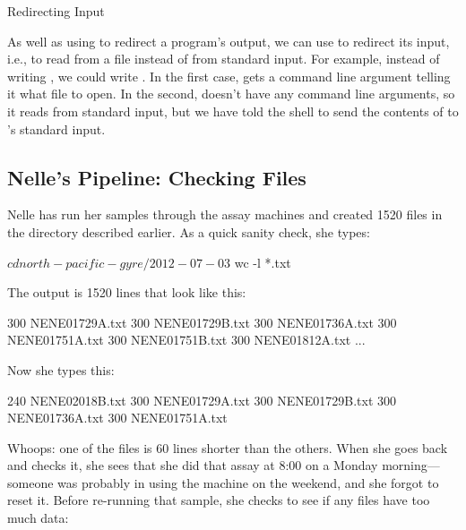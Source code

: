 \begin{swcbox}{Redirecting Input}


As well as using \code{\textgreater{}} to redirect a program's output,
we can use \code{\textless{}} to redirect its input, i.e., to read
from a file instead of from standard input. For example, instead of
writing , we could write
. In the first case,  gets
a command line argument telling it what file to open. In the second,
 doesn't have any command line arguments, so it reads from
standard input, but we have told the shell to send the contents of
 to 's standard input.

\end{swcbox}

\subsection*{Nelle's Pipeline: Checking Files}

Nelle has run her samples through the assay machines and created 1520
files in the  directory described
earlier. As a quick sanity check, she types:

\begin{VerbIn}
$ cd north-pacific-gyre/2012-07-03
$ wc -l *.txt
\end{VerbIn}

\noindent
The output is 1520 lines that look like this:

\begin{VerbOut}
300 NENE01729A.txt
300 NENE01729B.txt
300 NENE01736A.txt
300 NENE01751A.txt
300 NENE01751B.txt
300 NENE01812A.txt
...
\end{VerbOut}

Now she types this:


\begin{VerbOut}
 240 NENE02018B.txt
 300 NENE01729A.txt
 300 NENE01729B.txt
 300 NENE01736A.txt
 300 NENE01751A.txt
\end{VerbOut}

\noindent
Whoops: one of the files is 60 lines shorter than the others. When she
goes back and checks it, she sees that she did that assay at 8:00 on a
Monday morning---someone was probably in using the machine on the
weekend, and she forgot to reset it. Before re-running that sample, she
checks to see if any files have too much data:

